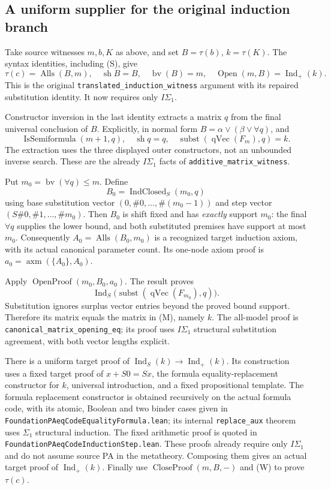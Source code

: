 \subsection{A uniform supplier for the original induction branch}

Take source witnesses $m,b,K$ as above, and set $B=\tau(b)$,
$k=\tau(K)$.  The syntax identities, including (S), give
\[
 \tau(c)=\operatorname{Alls}(B,m),\quad
 \operatorname{sh}B=B,\quad\operatorname{bv}(B)=m,\quad
 \operatorname{Open}(m,B)=\operatorname{Ind}_{+}(k).        \tag{W}
\]
This is the original \texttt{translated\_induction\_witness} argument
with its repaired substitution identity.  It now requires only $I\Sigma_1$.

Constructor inversion in the last identity extracts a matrix $q$ from
the final universal conclusion of $B$.  Explicitly, in normal form
$B=\alpha\vee(\beta\vee\forall q)$, and
\[
 \operatorname{IsSemiformula}(m+1,q),\quad
 \operatorname{sh}q=q,\quad
 \operatorname{subst}(\operatorname{qVec}(F_m),q)=k .       \tag{M}
\]
The extraction uses the three displayed outer constructors, not an
unbounded inverse search.  These are the already $I\Sigma_1$ facts of
\texttt{additive\_matrix\_witness}.

Put $m_0=\operatorname{bv}(\forall q)\le m$.  Define
\[
 B_0=\operatorname{IndClosed}_{S}(m_0,q)
\]
using base substitution vector $(0,\#0,\ldots,\#(m_0-1))$ and step
vector $(S\#0,\#1,\ldots,\#m_0)$.  Then $B_0$ is shift fixed and
has \emph{exactly} support $m_0$: the final $\forall q$ supplies the
lower bound, and both substituted premises have support at most $m_0$.
Consequently
$A_0=\operatorname{Alls}(B_0,m_0)$ is a recognized target induction
axiom, with its actual canonical parameter count.  Its one-node axiom
proof is $a_0=\operatorname{axm}(\{A_0\},A_0)$.

Apply $\operatorname{OpenProof}(m_0,B_0,a_0)$.  The result proves
\[
 \operatorname{Ind}_{S}\bigl(
       \operatorname{subst}(\operatorname{qVec}(F_{m_0}),q)\bigr).
\]
Substitution ignores surplus vector entries beyond the proved bound
support.  Therefore its matrix equals the matrix in (M), namely $k$.
The all-model proof is
\texttt{canonical\_matrix\_opening\_eq}; its proof uses $I\Sigma_1$
structural substitution agreement, with both vector lengths explicit.

There is a uniform target proof of
$\operatorname{Ind}_{S}(k)\to\operatorname{Ind}_{+}(k)$.
Its construction uses a fixed target proof of $x+S0=Sx$, the formula
equality-replacement constructor for $k$, universal introduction, and a
fixed propositional template.  The formula replacement constructor is
obtained recursively on the actual formula code, with its atomic,
Boolean and two binder cases given in
\texttt{FoundationPAeqCodeEqualityFormula.lean}; its internal
\texttt{replace\_aux} theorem uses $\Sigma_1$ structural induction.
The fixed arithmetic proof is quoted in
\texttt{FoundationPAeqCodeInductionStep.lean}.  These proofs already
require only $I\Sigma_1$ and do not assume source PA in the metatheory.
Composing them gives an actual target proof of $\operatorname{Ind}_{+}(k)$.
Finally use $\operatorname{CloseProof}(m,B,-)$ and (W) to prove $\tau(c)$.

